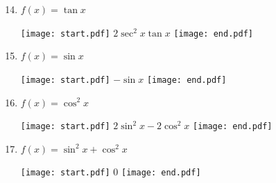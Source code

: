 \documentclass[12pt]{article}
\begin{document}
\begin{enumerate}
\setcounter{enumi}{13}

\item $f(x) = \tan{x}$ 

\texttt{[image: start.pdf]}
{{$2\sec^2{x}\tan{x}$}}
\texttt{[image: end.pdf]}


\item $f(x) = \sin{x}$ 

\texttt{[image: start.pdf]}
{{$-\sin{x}$}}
\texttt{[image: end.pdf]}


\item $f(x) = \cos^2{x}$ 

\texttt{[image: start.pdf]}
{{$2\sin^2{x}-2\cos^2{x}$}}
\texttt{[image: end.pdf]}


\item $f(x) = \sin^2{x}+\cos^2{x}$ 

\texttt{[image: start.pdf]}
{{0}}
\texttt{[image: end.pdf]}


\end{enumerate}

\end{document}
